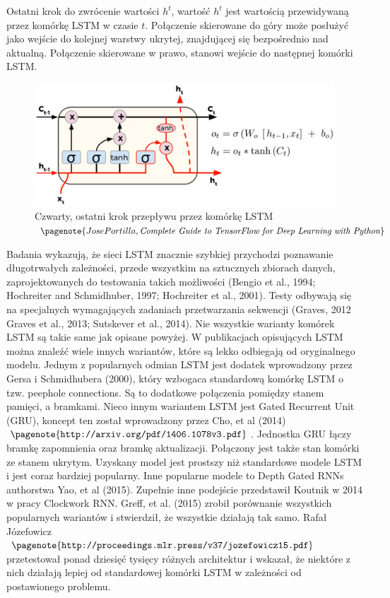 	Ostatni krok do zwrócenie wartości $h^{t}$, wartość $h^{t}$ jest wartością przewidywaną przez komórkę LSTM w czasie $t$. Połączenie skierowane do góry może posłużyć jako wejście do kolejnej warstwy ukrytej, znajdującej się bezpośrednio nad aktualną. Połączenie skierowane w prawo, stanowi wejście do następnej komórki LSTM.

	\begin{figure}[H]
		\centering
		\includegraphics[width=0.7\linewidth]{lstm_4_krok}
		\caption{Czwarty, ostatni krok przepływu przez komórkę LSTM $\pagenote{Jose Portilla, \textit{Complete Guide to TensorFlow for Deep Learning with Python}}$}
		\label{fig:lstm4krok}
	\end{figure}
	
	Badania wykazują, że sieci LSTM znacznie szybkiej przychodzi poznawanie długotrwałych zależności, przede wszystkim na sztucznych zbiorach danych, zaprojektowanych do testowania takich możliwości (Bengio et al., 1994; Hochreiter and Schmidhuber, 1997; Hochreiter et al., 2001). Testy odbywają się na specjalnych wymagających zadaniach przetwarzania sekwencji (Graves, 2012	Graves et al., 2013; Sutskever et al., 2014).
	Nie wszystkie warianty komórek LSTM są takie same jak opisane powyżej. W publikacjach opisujących LSTM można znaleźć wiele innych wariantów, które są lekko odbiegają od oryginalnego modelu. Jednym z popularnych odmian LSTM jest dodatek wprowadzony przez Gersa i Schmidhubera (2000), który wzbogaca standardową komórkę LSTM o tzw. peephole connections. Są to dodatkowe połączenia pomiędzy stanem pamięci, a bramkami. Nieco innym wariantem LSTM jest Gated Recurrent Unit (GRU), koncept ten został wprowadzony przez Cho, et al (2014)$\pagenote{\texttt{http://arxiv.org/pdf/1406.1078v3.pdf}}$. Jednostka GRU łączy bramkę zapomnienia oraz bramkę aktualizacji. Połączony jest także stan komórki ze stanem ukrytym. Uzyskany model jest prostszy niż standardowe modele LSTM i jest coraz bardziej popularny. Inne popularne modele to Depth Gated RNNs authorstwa Yao, et al (2015). Zupełnie inne podejście przedstawił Koutnik w 2014 w pracy Clockwork RNN. Greff, et al. (2015) zrobił porównanie wszystkich popularnych wariantów i stwierdził, że wszystkie działają tak samo. Rafał Józefowicz$\pagenote{\texttt{http://proceedings.mlr.press/v37/jozefowicz15.pdf}}$ przetestował ponad dziesięć tysięcy różnych architektur i wskazał, że niektóre z nich działają lepiej od standardowej komórki LSTM w zależności od postawionego problemu. 
	
